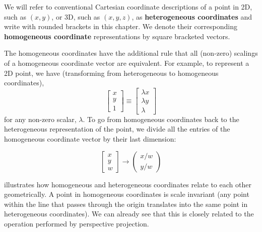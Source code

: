 We will refer to conventional Cartesian coordinate descriptions of a point in 2D, such as $(x,y)$, or 3D, such as $(x,y,z)$, as {\bf heterogeneous coordinates} and write with rounded brackets in this chapter.  We denote their corresponding {\bf homogeneous coordinate} representations by square bracketed vectors.


The homogeneous coordinates have the additional rule that all (non-zero) scalings of a homogeneous coordinate vector are equivalent.  For example, to represent a 2D point, we have (transforming from heterogeneous to homogeneous coordinates),
\begin{equation}
    \begin{bmatrix}
    x \\
    y \\
    1
    \end{bmatrix}
    \equiv 
    \begin{bmatrix}
    \lambda x \\
    \lambda y \\
    \lambda
    \end{bmatrix}
\end{equation}
for any non-zero scalar, $\lambda$. To go from homogeneous coordinates back to the heterogeneous representation of the point, we divide all the entries of the homogeneous coordinate vector by their last dimension:

\begin{equation}
    \begin{bmatrix}
    x \\
    y \\
    w
    \end{bmatrix}
    \rightarrow 
    \begin{pmatrix}
    x/w \\
    y/w 
    \end{pmatrix}
\end{equation}

\Fig{\ref{fig:homogeneousAndHeteregeneous}} illustrates how homogeneous and heterogeneous coordinates relate to each other geometrically. A point in homogeneous coordinates is scale invariant (any point within the line that passes through the origin translates into the same point in heterogeneous coordinates). We can already see that this is closely related to the operation performed by perspective projection. 

